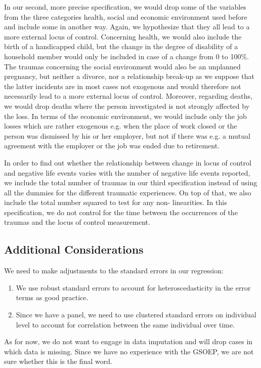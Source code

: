 \documentclass{scrartcl}
\begin{document}
In our second, more precise specification, we would drop some of the variables from the
three categories health, social and economic environment used before and include some in
another way. Again, we hypothesize that they all lead to a more external locus of
control. Concerning health, we would also include the birth of a handicapped child, but
the change in the degree of disability of a household member would only be included in
case of a change from 0 to 100\%. The traumas concerning the social environment would
also be an unplanned pregnancy, but neither a divorce, nor a relationship break-up as we
suppose that the latter incidents are in most cases not exogenous and would therefore
not necessarily lead to a more external locus of control. Moreover, regarding deaths, we
would drop deaths where the person investigated is not strongly affected by the loss. In
terms of the economic environment, we would include only the job losses which are rather
exogenous e.g. when the place of work closed or the person was dismissed by his or her
employer, but not if there was e.g. a mutual agreement with the employer or the job was
ended due to retirement.

In order to find out whether the relationship between change in locus of control and
negative life events varies with the number of negative life events reported, we include
the total number of traumas in our third specification instead of using all the dummies
for the different traumatic experiences. On top of that, we also include the total
number squared to test for any non- linearities. In this specification, we do not
control for the time between the occurrences of the traumas and the locus of control
measurement.


\subsection{Additional Considerations} %
\label{sub:additional_considerations}


We need to make adjustments to the standard errors in our regression:
\begin{enumerate}
    \item We use robust standard errors to account for heteroscedasticity in the error
    terms as good practice.
    \item Since we have a panel, we need to use clustered standard errors on individual
    level to account for correlation between the same individual over time.
\end{enumerate}

As for now, we do not want to engage in data imputation and will drop cases in which
data is missing. Since we have no experience with the GSOEP, we are not sure whether
this is the final word.


\printbibliography
\end{document}
